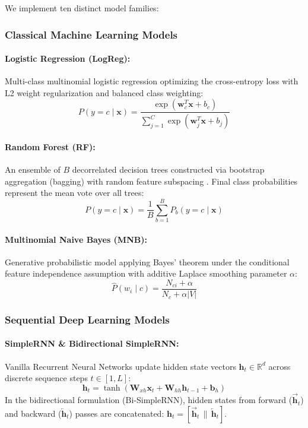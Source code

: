 \documentclass[11pt,a4paper]{article}
\begin{document}
We implement ten distinct model families:

\subsubsection{Classical Machine Learning Models}
\paragraph{Logistic Regression (LogReg):} Multi-class multinomial logistic regression optimizing the cross-entropy loss with L2 weight regularization and balanced class weighting:
\begin{equation}
P(y = c \mid \mathbf{x}) = \frac{\exp(\mathbf{w}_c^T \mathbf{x} + b_c)}{\sum_{j=1}^{C} \exp(\mathbf{w}_j^T \mathbf{x} + b_j)}
\end{equation}

\paragraph{Random Forest (RF):} An ensemble of $B$ decorrelated decision trees constructed via bootstrap aggregation (bagging) with random feature subspacing \cite{breiman2001random}. Final class probabilities represent the mean vote over all trees:
\begin{equation}
P(y = c \mid \mathbf{x}) = \frac{1}{B} \sum_{b=1}^B P_b(y = c \mid \mathbf{x})
\end{equation}

\paragraph{Multinomial Naive Bayes (MNB):} Generative probabilistic model applying Bayes' theorem under the conditional feature independence assumption with additive Laplace smoothing parameter $\alpha$:
\begin{equation}
\hat{P}(w_i \mid c) = \frac{N_{ci} + \alpha}{N_c + \alpha |V|}
\end{equation}

\subsubsection{Sequential Deep Learning Models}
\paragraph{SimpleRNN & Bidirectional SimpleRNN:}
Vanilla Recurrent Neural Networks update hidden state vectors $\mathbf{h}_t \in \mathbb{R}^d$ across discrete sequence steps $t \in [1, L]$:
\begin{equation}
\mathbf{h}_t = \tanh(\mathbf{W}_{xh} \mathbf{x}_t + \mathbf{W}_{hh} \mathbf{h}_{t-1} + \mathbf{b}_h)
\end{equation}
In the bidirectional formulation (Bi-SimpleRNN), hidden states from forward ($\overrightarrow{\mathbf{h}}_t$) and backward ($\overleftarrow{\mathbf{h}}_t$) passes are concatenated: $\mathbf{h}_t = [\overrightarrow{\mathbf{h}}_t \,\|\, \overleftarrow{\mathbf{h}}_t]$.
\end{document}
